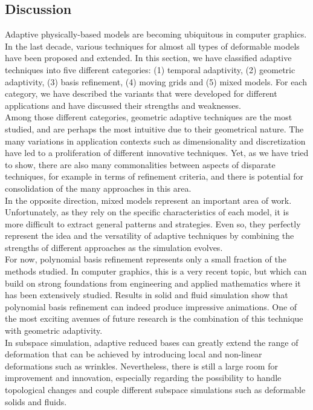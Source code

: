 \subsection{Discussion} \label{sec conclusion}
Adaptive physically-based models are becoming ubiquitous in computer graphics.
In the last decade, various techniques for almost all types of deformable models have been proposed and extended.
In this section, we have classified adaptive techniques into five different categories: (1) temporal adaptivity, (2) geometric adaptivity, (3) basis refinement, (4) moving grids and (5) mixed models.
For each category, we have described the variants that were developed for different applications and have discussed their strengths and weaknesses.
\\
Among those different categories, geometric adaptive techniques are the most studied, and are perhaps the most intuitive due to their geometrical nature.
The many variations in application contexts such as dimensionality and discretization have led to a proliferation of different innovative techniques.
Yet, as we have tried to show, there are also many commonalities between aspects of disparate techniques, for example in terms of refinement criteria, and there is potential for consolidation of the many approaches in this area.
\\
In the opposite direction, mixed models represent an important area of work.
Unfortunately, as they rely on the specific characteristics of each model, it is more difficult to extract general patterns and strategies. 
Even so, they perfectly represent the idea and the versatility of adaptive techniques by combining the strengths of different approaches as the simulation evolves.
\\
For now, polynomial basis refinement represents only a small fraction of the methods studied. In computer graphics, this is a very recent topic, but which can build on strong foundations from engineering and applied mathematics where it has been extensively studied. Results in solid and fluid simulation show that polynomial basis refinement can indeed produce impressive animations. One of the most exciting avenues of future research is the combination of this technique with geometric adaptivity.
\\
In subspace simulation, adaptive reduced bases can greatly extend the range of deformation that can be achieved by introducing local and non-linear deformations such as wrinkles. Nevertheless, there is still a large room for improvement and innovation, especially regarding the possibility to handle topological changes and couple different subspace simulations such as deformable solids and fluids.
